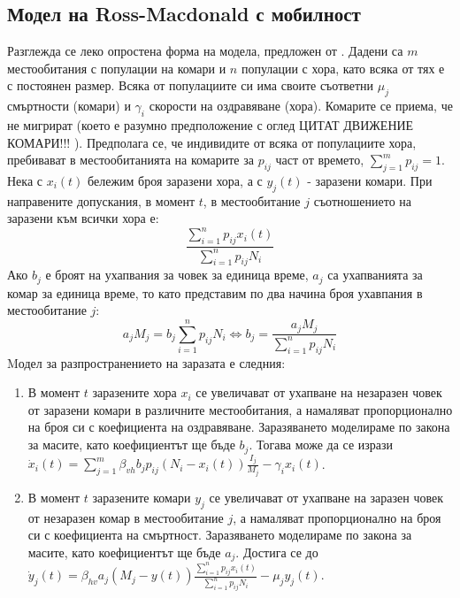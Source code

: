 \subsection{Модел на Ross-Macdonald с мобилност}
Разглежда се леко опростена форма на модела, предложен от \cite{Bichara2016}. Дадени са $m$ местообитания с популации на комари и $n$ популации с хора, като всяка от тях е с постоянен размер. Всяка от популациите си има своите съответни $\mu_j$ смъртности (комари) и $\gamma_i$ скорости на оздравяване (хора). Комарите се приема, че не мигрират (което е разумно предположение с оглед \color{Red} ЦИТАТ ДВИЖЕНИЕ КОМАРИ!!!
\color{Black}). Предполага се, че индивидите от всяка от популациите хора, пребивават в местообитанията на комарите за $p_{ij}$ част от времето, $\sum_{j=1}^m p_{ij} = 1$. \\
Нека с $x_i(t)$ бележим броя заразени хора, а с $y_j(t)$ - заразени комари. При направените допускания, в момент $t$, в местообитание $j$ съотношението на заразени към всички хора е:
\begin{equation}
  \frac{\sum_{i=1}^n p_{ij} x_i(t)}{\sum_{i=1}^n p_{ij} N_i}
\end{equation}
Ако $b_j$ е броят на ухапвания за човек за единица време, $a_j$ са ухапванията за комар за единица време, то като представим по два начина броя ухавпания в местообитание $j$:
\begin{equation}
  a_j M_j = b_j \sum_{i=1}^n p_{ij} N_i \iff b_j = \frac{a_j M_j}{\sum_{i=1}^n p_{ij} N_i}
\end{equation}
Mодел за разпространението на заразата е следния:
\begin{enumerate}
  \item В момент $t$ заразените хора $x_i$ се увеличават от ухапване на незаразен човек от заразени комари в различните местообитания, а намаляват пропорционално на броя си с коефициента на оздравяване. Заразяването моделираме по закона за масите, като коефициентът ще бъде $b_j$. Тогава може да се изрази $\dot{x}_i(t) = \sum_{j=1}^{m} \beta_{vh} b_j p_{ij} (N_i - x_i(t)) \frac{I_j}{M_j} - \gamma_i x_i(t)$.
  \item В момент $t$ заразените комари $y_j$ се увеличават от ухапване на заразен човек от незаразен комар в местообитание $j$, а намаляват пропорционално на броя си с коефициента на смъртност. Заразяването моделираме по закона за масите, като коефициентът ще бъде $a_j$. Достига се до $\dot{y}_j(t) = \beta_{hv} a_j (M_j - y(t)) \frac{\sum_{i=1}^n p_{ij} x_i(t)}{\sum_{i=1}^n p_{ij} N_i} - \mu_j y_j(t)$.
\end{enumerate}
